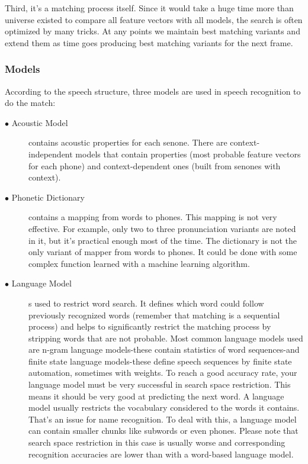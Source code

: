 \documentclass[12pt,a4paper,oldfontcommands]{memoir}
\begin{document}
Third, it's a matching process itself. Since it would take a huge time more than universe existed to compare all feature vectors with all models, the search is often optimized by many tricks. At any points we maintain best matching variants and extend them as time goes producing best matching variants for the next frame.

\subsubsection{Models}
According to the speech structure, three models are used in speech recognition to do the match:
\begin{description}
  \item[$\bullet$ Acoustic Model] contains acoustic properties for each senone. There are context-independent models that contain properties (most probable feature vectors for each phone) and context-dependent ones (built from senones with context). 
  \item[$\bullet$ Phonetic Dictionary]
contains a mapping from words to phones. This mapping is not very effective. For example, only two to three pronunciation variants are noted in it, but it's practical enough most of the time. The dictionary is not the only variant of mapper from words to phones. It could be done with some complex function learned with a machine learning algorithm. 

  \item[$\bullet$ Language Model]
	s used to restrict word search. It defines which word could follow previously recognized words (remember that matching is a sequential process) and helps to significantly restrict the matching process by stripping words that are not probable. Most common language models used are n-gram language models-these contain statistics of word sequences-and finite state language models-these define speech sequences by finite state automation, sometimes with weights. To reach a good accuracy rate, your language model must be very successful in search space restriction. This means it should be very good at predicting the next word. A language model usually restricts the vocabulary considered to the words it contains. That's an issue for name recognition. To deal with this, a language model can contain smaller chunks like subwords or even phones. Please note that search space restriction in this case is usually worse and corresponding recognition accuracies are lower than with a word-based language model.

\end{description}
\end{document}
